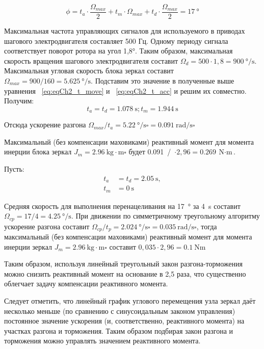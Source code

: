 \begin{equation}
	\label{eq:eqCh2_t_acc}
	\phi = t_a \cdot \frac{\Omega_{max}}{2} + t_m \cdot \Omega_{max} + t_d \cdot \frac{\Omega_{max}}{2} = \SI{17}{\degree}
\end{equation}

Максимальная частота управляющих сигналов для используемого в приводах шагового электродвигателя составляет 500 Гц. Одному периоду сигнала соответствует поворот ротора на угол 1,8°. Таким образом, максимальная скорость вращения шагового электродвигателя составит $\Omega_{d} = 500 \cdot 1,8 = \SI{900} {\degree/ \second}$. Максимальная угловая скорость блока зеркал составит $\Omega_{max}= 900/160 = \SI{5,625}{\degree/ \second}$. Подставим это значение в полученные выше уравнения ~\cref{eq:eqCh2_t_move} и  ~\cref{eq:eqCh2_t_acc} и решим их совместно. Получим:
\[
t_a = t_d = \SI{1,078}{\second}; t_m = \SI{1,944}{\second}
\]

Отсюда ускорение разгона $\Omega_{max} / t_a = \SI{5,22}{\degree/\second\square} = \SI{0,091}{\radian/\second\square}$


Максимальный (без компенсации маховиками) реактивный момент для момента инерции блока зеркал $J_m = \SI{2,96}{\kilogram\cdot\meter\square}$ будет \mbox{\SI{0,091}{\radian / \second\square}  $\cdot 2,96 = \SI{0,269}{\newton\cdot\meter}$}.

Пусть:
\begin{align*}
	t_a &= t_d = \SI{2,05}{\second}, \\
	t_m &= \SI{0}{\second}
\end{align*}

Средняя скорость для выполнения перенацеливания на \SI{17}{\degree}
за \SI{4}{\second} составит $\Omega_{cp} = 17 / 4 = \SI{4,25}{\degree / \second}$. При движении по симметричному треугольному алгоритму ускорение разгона составит $\Omega_{cp} / t_p = \SI{2,024}{\degree / \second\square} = \SI{0,035}{\radian / \second\square}$, тогда максимальный (без компенсации маховиками) реактивный момент для момента инерции зеркал $J_m = \SI{2,96}{\kilogram \cdot \meter\square}$ составит $0,035 \cdot 2,96 = \SI{0,1}{\newton\meter}$

Таким образом, используя линейный треугольный закон разгона-торможения можно снизить реактивный момент на основание в 2,5 раза, что существенно облегчает задачу компенсации реактивного момента.

Следует отметить, что линейный график углового перемещения узла зеркал даёт несколько меньше (по сравнению с синусоидальным законом управления) постоянное значение ускорения (и, соответственно, реактивного момента) на участках разгона и торможения. Таким образом подбирая закон разгона и торможения можно управлять значением реактивного момента.

